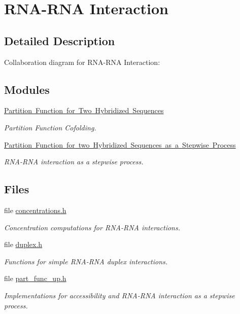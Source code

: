 \hypertarget{group__cofold}{}\section{R\+N\+A-\/\+R\+NA Interaction}
\label{group__cofold}


\subsection{Detailed Description}
Collaboration diagram for R\+N\+A-\/\+R\+NA Interaction\+:
\subsection*{Modules}
\begin{DoxyCompactItemize}
\item 
\mbox{\hyperlink{group__pf__cofold}{Partition Function for Two Hybridized Sequences}}
\begin{DoxyCompactList}\small\item\em Partition Function Cofolding. \end{DoxyCompactList}\item 
\mbox{\hyperlink{group__up__cofold}{Partition Function for two Hybridized Sequences as a Stepwise Process}}
\begin{DoxyCompactList}\small\item\em R\+N\+A-\/\+R\+NA interaction as a stepwise process. \end{DoxyCompactList}\end{DoxyCompactItemize}
\subsection*{Files}
\begin{DoxyCompactItemize}
\item 
file \mbox{\hyperlink{concentrations_8h}{concentrations.\+h}}
\begin{DoxyCompactList}\small\item\em Concentration computations for R\+N\+A-\/\+R\+NA interactions. \end{DoxyCompactList}\item 
file \mbox{\hyperlink{duplex_8h}{duplex.\+h}}
\begin{DoxyCompactList}\small\item\em Functions for simple R\+N\+A-\/\+R\+NA duplex interactions. \end{DoxyCompactList}\item 
file \mbox{\hyperlink{part__func__up_8h}{part\+\_\+func\+\_\+up.\+h}}
\begin{DoxyCompactList}\small\item\em Implementations for accessibility and R\+N\+A-\/\+R\+NA interaction as a stepwise process. \end{DoxyCompactList}\end{DoxyCompactItemize}
